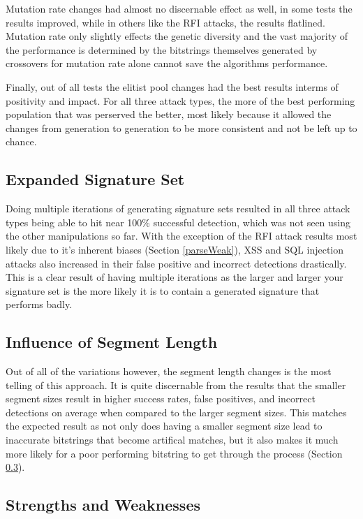 Mutation rate changes had almost no discernable effect as well, in some tests the results improved, while in others like the RFI attacks, the results flatlined.  Mutation rate only slightly effects the genetic diversity and the vast majority of the performance is determined by the bitstrings themselves generated by crossovers for mutation rate alone cannot save the algorithms performance.

Finally, out of all tests the elitist pool changes had the best results interms of positivity and impact.  For all three attack types, the more of the best performing population that was perserved the better, most likely because it allowed the changes from generation to generation to be more consistent and not be left up to chance.

\subsection{Expanded Signature Set}

Doing multiple iterations of generating signature sets resulted in all three attack types being able to hit near 100\% successful detection, which was not seen using the other manipulations so far.  With the exception of the RFI attack results most likely due to it's inherent biases (Section \ref{parseWeak}), XSS and SQL injection attacks also increased in their false positive and incorrect detections drastically.  This is a clear result of having multiple iterations as the larger and larger your signature set is the more likely it is to contain a generated signature that performs badly.

\subsection{Influence of Segment Length}

Out of all of the variations however, the segment length changes is the most telling of this approach.  It is quite discernable from the results that the smaller segment sizes result in higher success rates, false positives, and incorrect detections on average when compared to the larger segment sizes.  This matches the expected result as not only does having a smaller segment size lead to inaccurate bitstrings that become artifical matches, but it also makes it much more likely for a poor performing bitstring to get through the process (Section \ref{sec:genDisadvantages}).

\subsection{Strengths and Weaknesses}\label{sec:genDisadvantages}

